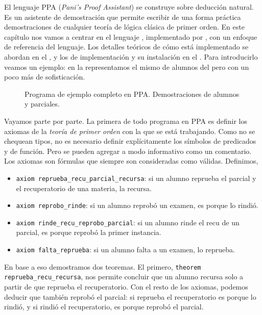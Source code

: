 El lenguaje PPA (\textit{Pani's Proof Assistant}) se construye sobre deducción natural. Es un asistente de demostración que permite
escribir de una forma práctica demostraciones de cualquier teoría de lógica
clásica de primer orden. En este capítulo nos vamos a centrar en el lenguaje
\ppaLang{}, implementado por \ppaTool{}, con un enfoque de referencia del
lenguaje. Los detalles teóricos de cómo está implementado se abordan en el
, y los de implementación y su instalación en el
. Para introducirlo veamos un ejemplo: en la
 representamos el mismo de alumnos del
 pero con un poco más de sofisticación.

\begin{figure}
    
    \caption{Programa de ejemplo completo en PPA. Demostraciones de alumnos y parciales.}
    \label{ppa:prog:alumnos}
\end{figure}

Vayamos parte por parte. La primera de todo programa en PPA es definir
los axiomas de la \textit{teoría de primer orden} con la que se está trabajando.
Como no se chequean tipos, no es necesario definir explícitamente los símbolos
de predicados y de función. Pero se pueden agregar a modo informativo como un
comentario. Los axiomas son fórmulas que siempre son consideradas como válidas.
Definimos,
\begin{itemize}
    \item \lstinline{axiom reprueba_recu_parcial_recursa}: si un alumno reprueba el
    parcial y el recuperatorio de una materia, la recursa.
    \item \lstinline{axiom reprobo_rinde}: si un alumno reprobó un examen, es porque lo
    rindió.
    \item \lstinline{axiom rinde_recu_reprobo_parcial}: si un alumno rinde el recu de
    un parcial, es porque reprobó la primer instancia.
    \item \lstinline{axiom falta_reprueba}: si un alumno falta a un examen, lo reprueba.
\end{itemize}
\lstset{firstnumber=last}


En base a eso demostramos dos teoremas. El primero, \lstinline{theorem reprueba_recu_recursa}, nos permite concluir que un alumno recursa solo a partir
de que reprueba el recuperatorio. Con el resto de los axiomas, podemos deducir
que también reprobó el parcial: si reprueba el recuperatorio es porque lo
rindió, y si rindió el recuperatorio, es porque reprobó el parcial.

